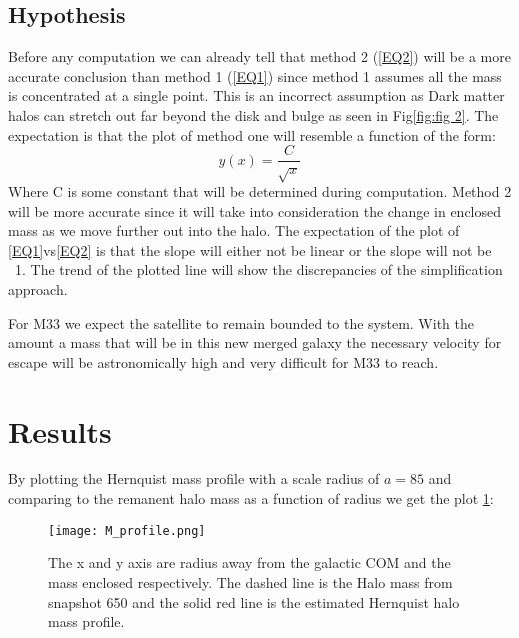 \documentclass[fleqn,usenatbib]{mnras}
\begin{document}
\subsection{Hypothesis}
\label{sec:Hypothesis}
Before any computation we can already tell that method 2 (\ref{EQ2}) will be a more accurate conclusion than method 1 (\ref{EQ1}) since method 1 assumes all the mass is concentrated at a single point. This is an incorrect assumption as Dark matter halos can stretch out far beyond the disk and bulge as seen in Fig\ref{fig:fig 2}. The expectation is that the plot of method one will resemble a function of the form:
\begin{equation}
    y(x) = \frac{C}{\sqrt{x}}
    \label{EQ4}
\end{equation}
Where C is some constant that will be determined during computation. Method 2 will be more accurate since it will take into consideration the change in enclosed mass as we move further out into the halo. 
The expectation of the plot of \ref{EQ1}vs\ref{EQ2} is that the slope will either not be linear or the slope will not be ~1. The trend of the plotted line will show the discrepancies of the simplification approach.

For M33 we expect the satellite to remain bounded to the system. With the amount a mass that will be in this new merged galaxy the necessary velocity for escape will be astronomically high and very difficult for M33 to reach. 

\section{Results}
By plotting the Hernquist mass profile with a scale radius of $a=85$ and comparing to the remanent halo mass as a function of radius we get the plot \ref{fig:fig 3}:
\begin{figure}
	\texttt{[image: M\_profile.png]}
    \caption{The x and y axis are radius away from the galactic COM and the mass enclosed   respectively. The dashed line is the Halo mass from snapshot 650 and the solid red line is the estimated Hernquist halo mass profile.}
    \label{fig:fig 3}
\end{figure}
\end{document}
